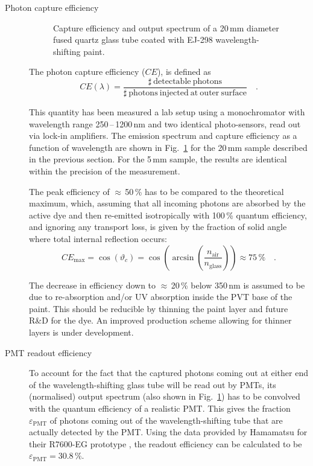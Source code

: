 \begin{description}

\item[Photon capture efficiency]
 \begin{figure}[t]
  \centering
  \caption{Capture efficiency and output spectrum of a 20\,mm diameter fused 
    quartz glass tube coated with EJ-298 wavelength-shifting paint.}
  \label{fig:capture_eff}
 \end{figure}
The photon capture efficiency ($CE$), is defined as 
\begin{equation}
 CE(\lambda) = \frac{\mathrm{\sharp\ detectable\ photons}}
    {\mathrm{\sharp\ photons\ injected\ at\ outer\ surface}}\quad.
\end{equation}

This quantity has been measured a lab setup using a monochromator with 
wavelength range 250\,--\,1200\,nm and two identical photo-sensors, read out via 
lock-in amplifiers. The emission spectrum and capture efficiency as a function 
of wavelength are shown in Fig.~\ref{fig:capture_eff} for the 20\,mm sample 
described in the previous section. For the 5\,mm sample, the results are 
identical within the precision of the measurement.

The peak efficiency of $\approx$\,50\,\% has to be compared to the theoretical 
maximum, which, assuming that all incoming photons are absorbed by the active 
dye and then re-emitted isotropically with 100\,\% quantum efficiency, and
ignoring any transport loss, is given by the fraction of solid angle where total 
internal reflection occurs:
\begin{equation}
 CE_{\mathrm{max}} = \cos(\vartheta_c) = 
\cos\left(\arcsin\left(\frac{n_\mathrm{air}}{n_\mathrm{glass}}\right)\right) 
\approx 75\,\%\quad.
\end{equation}

The decrease in efficiency down to $\approx$\,20\,\% below 350\,nm is assumed to 
be due to re-absorption and/or UV absorption inside the PVT base of the paint. 
This should be reducible by thinning the paint layer and future R\&D for
the dye. An improved production scheme allowing for thinner layers is under 
development.

\item[PMT readout efficiency]
To account for the fact that the captured photons coming out at either end of 
the wavelength-shifting glass tube will be read out by PMTs, its (normalised) 
output spectrum (also shown in Fig.~\ref{fig:capture_eff}) has to be convolved
with the quantum efficiency of a realistic PMT. This gives the fraction 
$\varepsilon_\mathrm{PMT}$ of photons coming out of the wavelength-shifting tube 
that are actually detected by the PMT. Using the data provided by Hamamatsu for 
their R7600-EG prototype \cite{hamamatsu}, the readout efficiency can be 
calculated to be $\varepsilon_\mathrm{PMT} = 30.8\,\%$.


\end{description}
